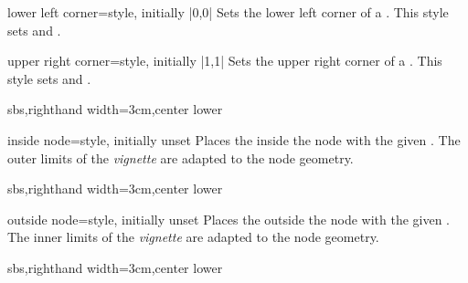 \begin{vigTcbKey}[][doc new=2016-04-22]{lower left corner}{=}{style, initially |0,0|}
  Sets the lower left corner of a .
  This style sets  and .
\end{vigTcbKey}

\begin{vigTcbKey}[][doc new=2016-04-22]{upper right corner}{=}{style, initially |1,1|}
  Sets the upper right corner of a .
  This style sets  and .
\end{vigTcbKey}


\begin{dispExample*}{sbs,righthand width=3cm,center lower}
\end{dispExample*}

\enlargethispage*{1cm}

\begin{vigTcbKey}[][doc new=2016-04-22]{inside node}{=}{style, initially unset}
  Places the  inside the node with the given .
  The outer limits of the \emph{vignette} are adapted to the node geometry.
\begin{dispExample*}{sbs,righthand width=3cm,center lower}
\end{dispExample*}
\end{vigTcbKey}

\clearpage

\begin{vigTcbKey}[][doc new=2016-04-22]{outside node}{=}{style, initially unset}
  Places the  outside the node with the given .
  The inner limits of the \emph{vignette} are adapted to the node geometry.
\begin{dispExample*}{sbs,righthand width=3cm,center lower}
\end{dispExample*}
\end{vigTcbKey}


